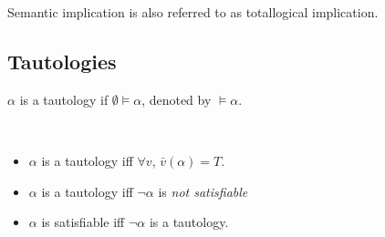 Semantic implication is also referred to as totallogical implication.

\subsection{Tautologies}
\label{sub:Tautologies}

\begin{definition}[Tautologies]
    $\alpha$ is a tautology if $\emptyset \vDash \alpha$, denoted by $\vDash \alpha$.
\end{definition}
\begin{remark}
    ~{}
    \begin{itemize}
        \item $\alpha$ is a tautology iff $\forall v$, $\bar{v}(\alpha)=T$.
        \item $\alpha$ is a tautology iff $\neg \alpha$ is \emph{not satisfiable}
        \item $\alpha$ is satisfiable iff $\neg \alpha$ is a tautology.
    \end{itemize}
\end{remark}
